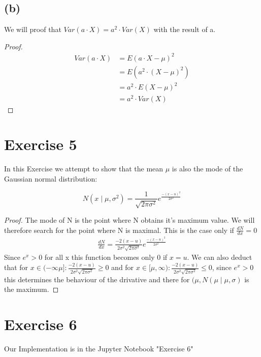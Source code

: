 \documentclass{article}
\begin{document}
\subsection*{(b)}
We will proof that $Var(a \cdot X) = a^{2} \cdot Var(X)$ with the result of a.
\begin{proof}
	\begin{align*}
		Var(a \cdot X) 
		&= E(a \cdot X - \mu)^{2} \\
		&= E(a^{2} \cdot (X - \mu)^{2} )\\
		&= a^{2} \cdot E(X - \mu)^{2} \\
		&= a^{2} \cdot Var(X)
	\end{align*}
\end{proof}

\section*{Exercise 5}

In this Exercise we attempt to show that the mean $\mu$ is also the mode of the Gaussian normal distribution:

\[
N(x \mid \mu, \sigma^2)= \frac{1}{\sqrt{2 \pi \sigma^2}}e^{\frac{-(x-u)^2}{2\sigma^2}}    
\]



\begin{proof}
    The mode of N is the point where N obtains it's maximum value. We will therefore search for the point where N is maximal. This is the case only if $\frac{dN}{dx}=0$ 
    \begin{align*}
        \frac{dN}{dx}=  \frac{-2(x-u)}{2\sigma^2 \sqrt{2 \pi \sigma^2}}e^{\frac{-(x-u)^2}{2\sigma^2}}  
    \end{align*}
    Since $e^x>0$ for all x this function becomes only 0 if $x=u$. We can also deduct that for $x \in (- \infty \mu] : \frac{-2(x-u)}{2\sigma^2 \sqrt{2 \pi \sigma^2}} \geq 0$ and  for $x \in [\mu, \infty) : \frac{-2(x-u)}{2\sigma^2 \sqrt{2 \pi \sigma^2}} \leq 0$, since $e^x>0$ this determines the behaviour of the drivative and there for $(\mu, N(\mu \mid \mu,\sigma)$ is the maximum.

\end{proof}

\section*{Exercise 6}
Our Implementation is in the Jupyter Notebook "Exercise 6"


\end{document}
